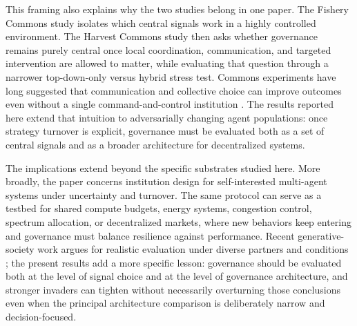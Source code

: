 This framing also explains why the two studies belong in one paper. The Fishery Commons study isolates which central signals work in a highly controlled environment. The Harvest Commons study then asks whether governance remains purely central once local coordination, communication, and targeted intervention are allowed to matter, while evaluating that question through a narrower top-down-only versus hybrid stress test. Commons experiments have long suggested that communication and collective choice can improve outcomes even without a single command-and-control institution \citep{ostrom1992covenants,walker2000collective}. The results reported here extend that intuition to adversarially changing agent populations: once strategy turnover is explicit, governance must be evaluated both as a set of central signals and as a broader architecture for decentralized systems.

The implications extend beyond the specific substrates studied here. More broadly, the paper concerns institution design for self-interested multi-agent systems under uncertainty and turnover. The same protocol can serve as a testbed for shared compute budgets, energy systems, congestion control, spectrum allocation, or decentralized markets, where new behaviors keep entering and governance must balance resilience against performance. Recent generative-society work argues for realistic evaluation under diverse partners and conditions \citep{piatti2024cooperate,govsim_repo,mercer2023willowbrook}; the present results add a more specific lesson: governance should be evaluated both at the level of signal choice and at the level of governance architecture, and stronger invaders can tighten without necessarily overturning those conclusions even when the principal architecture comparison is deliberately narrow and decision-focused.
